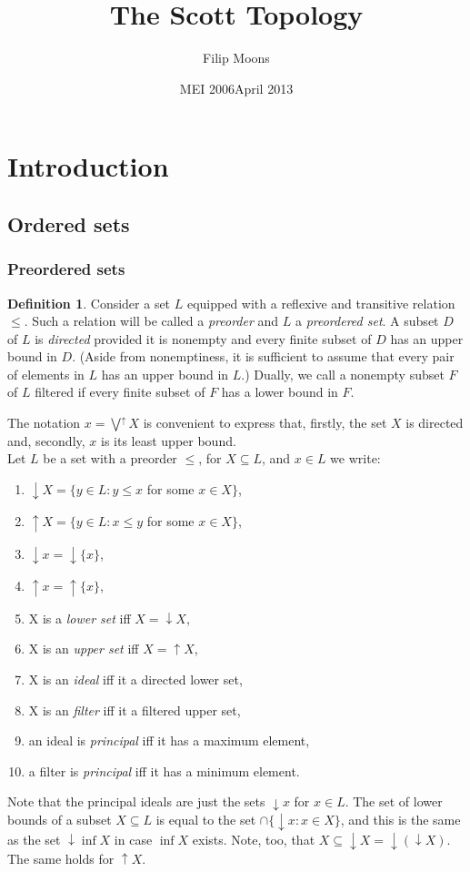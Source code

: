 \documentclass[a4paper,12pt]{article}
\author{Filip Moons}
\title{The Scott Topology}
\date{MEI 2006}
\date{April 2013}
\theoremstyle{definition}
\newtheorem{definition}[theorem]{Definition}
\begin{document}
\maketitlepage


\tableofcontents
\newpage
\section{Introduction}

\subsection{Ordered sets}
\subsubsection{Preordered sets}
\begin{definition} Consider a set $L$ equipped with a reflexive and transitive relation $\leq$. Such a relation will be called a \emph{preorder} and $L$ a \emph{preordered set}. A subset $D$ of $L$ is \emph{directed} provided it is nonempty and every finite subset of $D$ has an upper bound in $D$. (Aside from nonemptiness, it is sufficient to assume that every pair of elements in $L$ has an upper bound in $L$.) Dually, we call a nonempty subset $F$ of $L$ filtered if every finite subset of $F$ has a lower bound in $F$.
\end{definition}

The notation $x = \bigvee^{\uparrow} X$ is convenient to express that, firstly, the set $X$ is directed and, secondly, $x$ is its least upper bound. \\

Let $L$ be a set with a preorder $\leq$, for $X \subseteq L$, and $x \in L$ we write:
\begin{enumerate}
  \item $\downarrow X = \{y \in L: y \leq x$ for some $x \in X\}$,
  \item $\uparrow X = \{y \in L: x \leq y$ for some $x \in X\}$,
  \item $\downarrow x = \downarrow\{x\}$,
  \item $\uparrow x = \uparrow\{x\}$,
  \item X is a \emph{lower set} iff $X = \downarrow X$,
  \item X is an \emph{upper set} iff $X = \uparrow X$,
  \item X is an \emph{ideal} iff it a directed lower set,
  \item X is an \emph{filter} iff it a filtered upper set,
  \item an ideal is \emph{principal} iff it has a maximum element,
  \item a filter is \emph{principal} iff it has a minimum element.
\end{enumerate}
Note that the principal ideals are just the sets $\downarrow x$ for $x \in L$. The set of lower bounds of a subset $X \subseteq L$ is equal to the set $\cap\{\downarrow x: x \in X\}$, and this is the same as the set $\downarrow \inf X$ in case $\inf X$ exists. Note, too, that $X \subseteq \downarrow X = \downarrow(\downarrow X)$. The same holds for $\uparrow X$.
\end{document}
